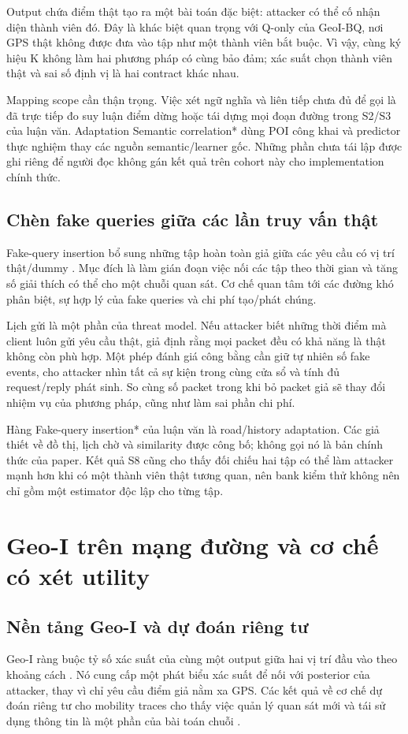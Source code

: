 Output chứa điểm thật tạo ra một bài toán đặc biệt: attacker có thể cố nhận diện thành viên đó.
Đây là khác biệt quan trọng với Q-only của GeoI-BQ, nơi GPS thật không được đưa vào tập như một thành
viên bắt buộc. Vì vậy, cùng ký hiệu K không làm hai phương pháp có cùng bảo đảm; xác suất chọn thành
viên thật và sai số định vị là hai contract khác nhau.

Mapping scope cần thận trọng. Việc xét ngữ nghĩa và liên tiếp chưa đủ để gọi là đã trực tiếp đo suy
luận điểm dừng hoặc tái dựng mọi đoạn đường trong S2/S3 của luận văn. Adaptation Semantic correlation*
dùng POI công khai và predictor thực nghiệm thay các nguồn semantic/learner gốc. Những phần chưa
tái lập được ghi riêng để người đọc không gán kết quả trên cohort này cho implementation chính thức.

\subsection{Chèn fake queries giữa các lần truy vấn thật}
Fake-query insertion bổ sung những tập hoàn toàn giả giữa các yêu cầu có vị trí thật/dummy
\cite{fake}. Mục đích là làm gián đoạn việc nối các tập theo thời gian và tăng số giải thích có thể
cho một chuỗi quan sát. Cơ chế quan tâm tới các đường khó phân biệt, sự hợp lý của fake queries và
chi phí tạo/phát chúng.

Lịch gửi là một phần của threat model. Nếu attacker biết những thời điểm mà client luôn gửi yêu cầu
thật, giả định rằng mọi packet đều có khả năng là thật không còn phù hợp. Một phép đánh giá công
bằng cần giữ tự nhiên số fake events, cho attacker nhìn tất cả sự kiện trong cùng cửa sổ và tính đủ
request/reply phát sinh. So cùng số packet trong khi bỏ packet giả sẽ thay đổi nhiệm vụ của phương
pháp, cũng như làm sai phần chi phí.

Hàng Fake-query insertion* của luận văn là road/history adaptation. Các giả thiết về đồ thị, lịch
chờ và similarity được công bố; không gọi nó là bản chính thức của paper. Kết quả S8 cũng cho thấy
đối chiếu hai tập có thể làm attacker mạnh hơn khi có một thành viên thật tương quan, nên bank kiểm
thử không nên chỉ gồm một estimator độc lập cho từng tập.

\section{Geo-I trên mạng đường và cơ chế có xét utility}
\subsection{Nền tảng Geo-I và dự đoán riêng tư}
Geo-I ràng buộc tỷ số xác suất của cùng một output giữa hai vị trí đầu vào theo khoảng cách
\cite{geoi}. Nó cung cấp một phát biểu xác suất để nối với posterior của attacker, thay vì chỉ yêu cầu
điểm giả nằm xa GPS. Các kết quả về cơ chế dự đoán riêng tư cho mobility traces cho thấy việc quản
lý quan sát mới và tái sử dụng thông tin là một phần của bài toán chuỗi \cite{predictive}.

